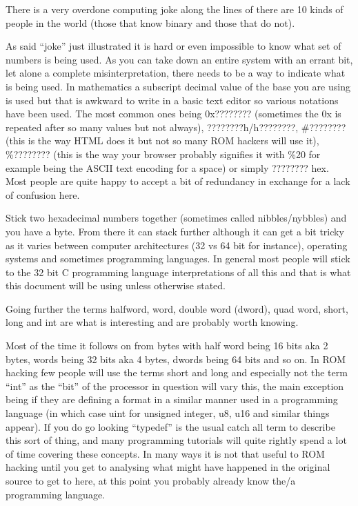 \documentclass[
]{book}
\begin{document}
There is a very overdone computing joke along the lines of there are 10 kinds of people in the world (those that know binary and those that do not).

As said ``joke'' just illustrated it is hard or even impossible to know what set of numbers is being used. As you can take down an entire system with an errant bit, let alone a complete misinterpretation, there needs to be a way to indicate what is being used. In mathematics a subscript decimal value of the base you are using is used but that is awkward to write in a basic text editor so various notations have been used. The most common ones being 0x???????? (sometimes the 0x is repeated after so many values but not always), ????????h/h????????, \#???????? (this is the way HTML does it but not so many ROM hackers will use it), \%???????? (this is the way your browser probably signifies it with \%20 for example being the ASCII text encoding for a space) or simply ???????? hex. Most people are quite happy to accept a bit of redundancy in exchange for a lack of confusion here.

Stick two hexadecimal numbers together (sometimes called nibbles/nybbles) and you have a byte. From there it can stack further although it can get a bit tricky as it varies between computer architectures (32 vs 64 bit for instance), operating systems and sometimes programming languages. In general most people will stick to the 32 bit C programming language interpretations of all this and that is what this document will be using unless otherwise stated.

Going further the terms halfword, word, double word (dword), quad word, short, long and int are what is interesting and are probably worth knowing.

Most of the time it follows on from bytes with half word being 16 bits aka 2 bytes, words being 32 bits aka 4 bytes, dwords being 64 bits and so on. In ROM hacking few people will use the terms short and long and especially not the term ``int'' as the ``bit'' of the processor in question will vary this, the main exception being if they are defining a format in a similar manner used in a programming language (in which case uint for unsigned integer, u8, u16 and similar things appear). If you do go looking ``typedef'' is the usual catch all term to describe this sort of thing, and many programming tutorials will quite rightly spend a lot of time covering these concepts. In many ways it is not that useful to ROM hacking until you get to analysing what might have happened in the original source to get to here, at this point you probably already know the/a programming language.
\end{document}
